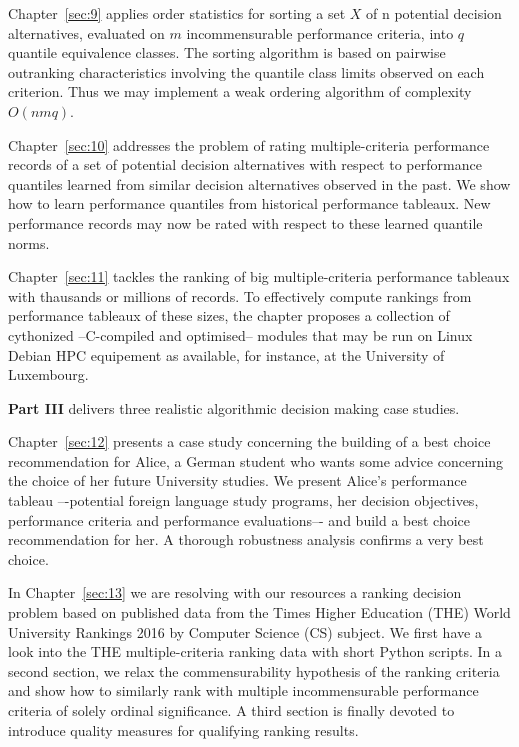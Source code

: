 Chapter~\ref{sec:9} applies order statistics for sorting a set $X$ of n potential decision alternatives, evaluated on $m$ incommensurable performance criteria, into $q$ quantile equivalence classes. The sorting algorithm is based on pairwise outranking characteristics involving the quantile class limits observed on each criterion. Thus we may implement a weak ordering algorithm of complexity $O(nmq)$.

Chapter~\ref{sec:10} addresses the problem of rating multiple-criteria performance records of a set of potential decision alternatives with respect to performance quantiles learned from similar decision alternatives observed in the past. We show how to learn performance quantiles from historical performance tableaux. New performance records may now be rated with respect to these learned quantile norms.

Chapter~\ref{sec:11} tackles the ranking of big multiple-criteria performance tableaux with thausands or millions of records. To effectively compute rankings from performance tableaux of these sizes, the chapter proposes a collection of cythonized --C-compiled and optimised-- modules that may be run on Linux Debian HPC equipement as available, for instance, at the University of Luxembourg.
\vspace{5pt}

\textbf{Part III} delivers three realistic algorithmic decision making case studies.

Chapter~\ref{sec:12} presents a case study concerning the building of a best choice recommendation for Alice, a German student who wants some advice concerning the choice of her future University studies. We present Alice’s performance tableau –-potential foreign language study programs, her decision objectives, performance criteria and performance evaluations–- and build a best choice recommendation for her. A thorough robustness analysis confirms a very best choice.

In Chapter~\ref{sec:13} we are resolving with our \Digraph resources a ranking decision problem based on published data from the Times Higher Education (THE) World University Rankings 2016 by Computer Science (CS) subject. We first have a look into the THE multiple-criteria ranking data with short Python scripts. In a second section, we relax the commensurability hypothesis of the ranking criteria and show how to similarly rank with multiple incommensurable performance criteria of solely ordinal significance. A third section is finally devoted to introduce quality measures for qualifying ranking results.


